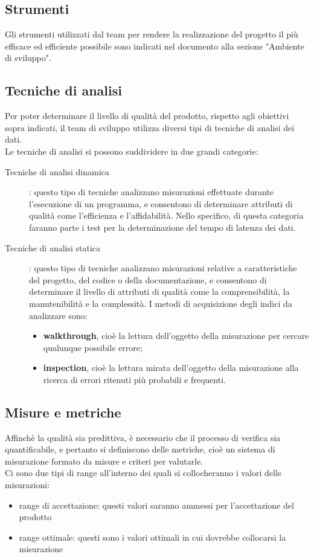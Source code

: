 	\subsection{Strumenti}
	Gli strumenti utilizzati dal team per rendere la realizzazione del progetto il più efficace ed efficiente possibile sono indicati nel documento  alla sezione "Ambiente di sviluppo".
	\subsection{Tecniche di analisi}
	Per poter determinare il livello di qualità del prodotto, rispetto agli obiettivi sopra indicati, il team di sviluppo utilizza diversi tipi di tecniche di analisi dei dati.\\
	Le tecniche di analisi si possono suddividere in due grandi categorie:
	\begin{description}
		\item[Tecniche di analisi dinamica]: questo tipo di tecniche analizzano misurazioni effettuate durante l'esecuzione di un programma, e consentono di determinare attributi di qualità come l'efficienza e l'affidabilità. Nello specifico, di questa categoria faranno parte i test per la determinazione del tempo di latenza dei dati.
		\item [Tecniche di analisi statica]: questo tipo di tecniche analizzano misurazioni relative a caratteristiche del progetto, del codice o della documentazione, e consentono di determinare il livello di attributi di qualità come la comprensibilità, la manutenibilità e la complessità. I metodi di acquisizione degli indici da analizzare sono:
		\begin{itemize}
			\item \textbf{walkthrough}, cioè la lettura dell'oggetto della misurazione per cercare qualunque possibile errore;
		 	\item \textbf{inspection}, cioè la lettura mirata dell'oggetto della misurazione alla ricerca di errori ritenuti più probabili e frequenti.
		\end{itemize}
	\end{description}
	\subsection{Misure e metriche}
	Affinchè la qualità sia predittiva, è necessario che il processo di verifica sia quantificabile, e pertanto si definiscono delle metriche, cioè un sistema di misurazione formato da misure e criteri per valutarle.\\
	Ci sono due tipi di range all'interno dei quali si collocheranno i valori delle misurazioni:
	\begin{itemize}
		\item range di accettazione: questi valori saranno ammessi per l'accettazione del prodotto
		\item range ottimale: questi sono i valori ottimali in cui dovrebbe collocarsi la misurazione
	\end{itemize}
